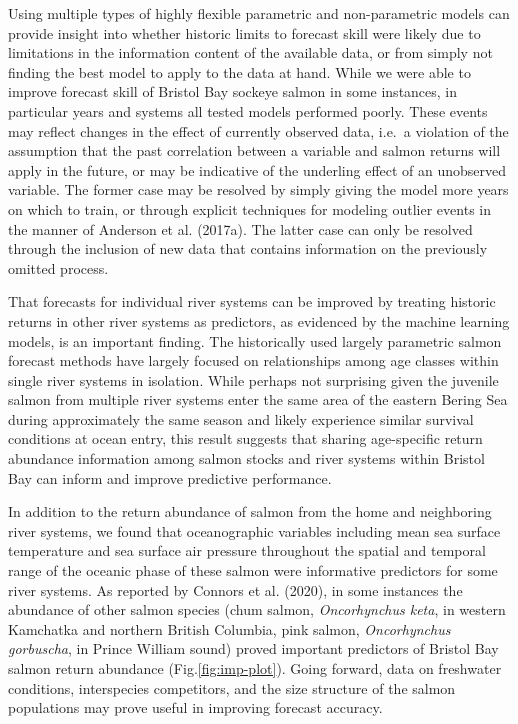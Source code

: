 \documentclass[
]{article}
\begin{document}
Using multiple types of highly flexible parametric and non-parametric models can provide insight into whether historic limits to forecast skill were likely due to limitations in the information content of the available data, or from simply not finding the best model to apply to the data at hand. While we were able to improve forecast skill of Bristol Bay sockeye salmon in some instances, in particular years and systems all tested models performed poorly. These events may reflect changes in the effect of currently observed data, i.e.~a violation of the assumption that the past correlation between a variable and salmon returns will apply in the future, or may be indicative of the underling effect of an unobserved variable. The former case may be resolved by simply giving the model more years on which to train, or through explicit techniques for modeling outlier events in the manner of Anderson et al. (2017a). The latter case can only be resolved through the inclusion of new data that contains information on the previously omitted process.

That forecasts for individual river systems can be improved by treating historic returns in other river systems as predictors, as evidenced by the machine learning models, is an important finding. The historically used largely parametric salmon forecast methods have largely focused on relationships among age classes within single river systems in isolation. While perhaps not surprising given the juvenile salmon from multiple river systems enter the same area of the eastern Bering Sea during approximately the same season and likely experience similar survival conditions at ocean entry, this result suggests that sharing age-specific return abundance information among salmon stocks and river systems within Bristol Bay can inform and improve predictive performance.

In addition to the return abundance of salmon from the home and neighboring river systems, we found that oceanographic variables including mean sea surface temperature and sea surface air pressure throughout the spatial and temporal range of the oceanic phase of these salmon were informative predictors for some river systems. As reported by Connors et al. (2020), in some instances the abundance of other salmon species (chum salmon, \emph{Oncorhynchus keta}, in western Kamchatka and northern British Columbia, pink salmon, \emph{Oncorhynchus gorbuscha}, in Prince William sound) proved important predictors of Bristol Bay salmon return abundance (Fig.\ref{fig:imp-plot}). Going forward, data on freshwater conditions, interspecies competitors, and the size structure of the salmon populations may prove useful in improving forecast accuracy.
\end{document}
